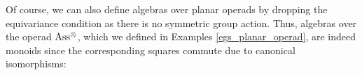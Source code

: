     \begin{rem}
        Of course, we can also define algebras over planar operads by dropping
        the equivariance condition as there is no symmetric group action. Thus,
        algebras over the operad $\operatorname{Ass^{\otimes}}$, which we defined in Examples
        \ref{egs_planar_operad}, are indeed monoids since the corresponding
        squares commute due to canonical isomorphisms:
            \begin{center}
            \end{center}  

            \begin{center}
            \end{center}  
    \end{rem}
    
